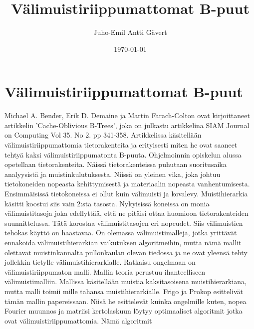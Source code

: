 \documentclass[finnish]{tktltiki2}
\title{Välimuistiriippumattomat B-puut}
\author{Juho-Emil Antti Gävert}
\date{\today}
\theoremstyle{definition}
\theoremstyle{remark}
\begin{document}

\maketitle        %
\makeabstract     %

\newpage          %



\section{Välimuistiriippumattomat B-puut}


Michael A. Bender, Erik D. Demaine ja Martin Farach-Colton ovat kirjoittaneet
artikkelin 'Cache-Oblivious B-Trees', joka on julkastu artikkelina SIAM Journal
on Computing Vol 35. No 2. pp 341-358. Artikkelissa käsitellään
välimuistiriippumattomia tietorakenteita ja erityisesti miten he ovat saaneet
tehtyä kaksi välimuistiriippumatonta B-puuta.
\newline \indent Ohjelmoinnin opiskelun alussa opetellaan tietorakenteita.
Näissä tietorakenteissa puhutaan suoritusaika analyysistä ja
muistinkulutuksesta. Niissä on yleinen vika, joka johtuu tietokoneiden nopeasta
kehittymisestä ja materiaalin nopeasta vanhentumisesta. Ensimmäisissä
tietokoneissa ei ollut kuin välimuisti ja kovalevy. Muistihierarkia käsitti
koostui siis vain 2:sta tasosta. Nykyisissä koneissa on monia välimuistitasoja
joka edellyttää, että ne pitäisi ottaa huomioon tietorakenteiden
suunnittelussa. Tätä korostaa välimuistitasojen eri nopeudet. Siis välimuistien
tehokas käyttö on haastavaa. On olemassa välimuistimalleja, jotka yrittävät
ennakoida välimuistihierarkian vaikutuksen algoritmeihin, mutta nämä mallit
olettavat muistinkannalta pullonkaulan olevan tiedossa ja ne ovat yleensä tehty
jollekkin tietylle välimuistihierarkialle.
\newline \indent Ratkaisu ongelmaan on välimuistiriippumaton malli. Mallin teoria perustuu
ihanteelliseen välimuistimalliin. Mallissa käsitellään muistia kaksitasoisena
muistihierarkiana, mutta malli toimii mille tahansa muistihierarkialle. Frigo
ja Prokop esittelivät tämän mallin papereissaan. Niisä he esittelevät kuinka
ongelmille kuten, nopea Fourier muunnos ja matriisi kertolaskuun löytyy
optimaaliset algoritmit jotka ovat välimuistiriippumattomia. Nämä algoritmit
\end{document}
